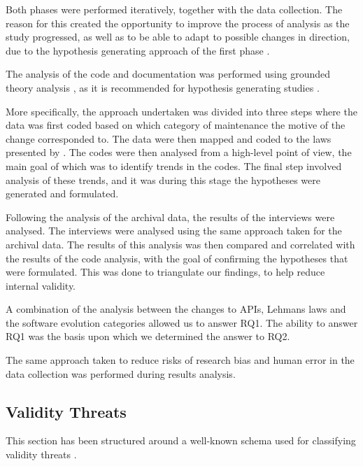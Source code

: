 \documentclass[10pt,twocolumn]{article}
\begin{document}
Both phases were performed iteratively, together with the data collection. The reason for this created the opportunity to improve the process of analysis as the study progressed, as well as to be able to adapt to possible changes in direction, due to the hypothesis generating approach of the first phase \cite{andersson2007spiral}. 

The analysis of the code and documentation was performed using grounded theory analysis \cite{seaman1999qualitative}, as it is recommended for hypothesis generating studies \cite{runeson2009guidelines} \cite{seaman1999qualitative}.

More specifically, the approach undertaken was divided into three steps where the data was first coded based on which category of maintenance \cite{chapin2001types} the motive of the change corresponded to. The data were then mapped and coded to the laws presented by \cite{lehman1980programs}. The codes were then analysed from a high-level point of view, the main goal of which was to identify trends in the codes. The final step involved analysis of these trends, and it was during this stage the hypotheses were generated and formulated. 

Following the analysis of the archival data, the results of the interviews were analysed. The interviews were analysed using the same approach taken for the archival data. The results of this analysis was then compared and correlated with the results of the code analysis, with the goal of confirming the hypotheses that were formulated. This was done to triangulate our findings, to help reduce internal validity. 

A combination of the analysis between the changes to APIs, Lehmans laws and the software evolution categories \cite{chapin2001types}\cite{lehman1980programs} allowed us to answer RQ1. The ability to answer RQ1 was the basis upon which we determined the answer to RQ2. 

The same approach taken to reduce risks of research bias and human error in the data collection was performed during results analysis. 


\subsection{Validity Threats}
This section has been structured around a well-known schema used for classifying validity threats \cite{runeson2009guidelines}.
\end{document}
